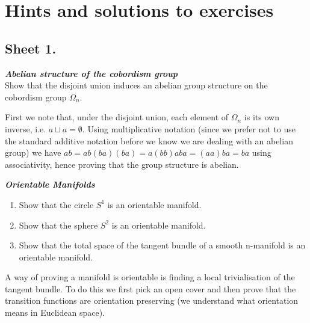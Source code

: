 \section{Hints and solutions to exercises}



\subsection*{Sheet 1.}

\begin{exercise} \textbf{\textit{Abelian structure of the cobordism group}}\\
Show that the disjoint union induces an abelian group structure on the cobordism group \(\Omega_n\).
\end{exercise}

\noindent First we note that, under the disjoint union, each element of $\Omega_n$ is its own inverse, i.e. $a\sqcup a=\emptyset$. Using multiplicative notation (since we prefer not to use the standard additive notation before we know we are dealing with an abelian group) we have $ab=ab(ba)(ba)=a(bb)aba=(aa)ba=ba$ using associativity, hence proving that the group structure is abelian.

\hspace{1cm}

\begin{exercise} \textbf{\textit{Orientable Manifolds}}
\begin{enumerate}[label=(\alph*)]
    \item Show that the circle $S^1$ is an orientable manifold. 
    \item Show that the sphere $S^2$ is an orientable manifold. 
    \item Show that the total space of the tangent bundle of a smooth n-manifold is an orientable
manifold. 
\end{enumerate}
\end{exercise}

\noindent A way of proving a manifold is orientable is finding a local trivialisation of the tangent bundle. To do this we first pick an open cover and then prove that the transition functions are orientation preserving (we understand what orientation means in Euclidean space). 

